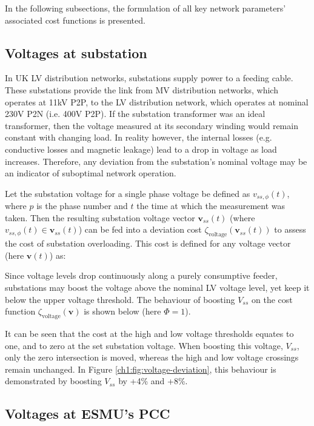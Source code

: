In the following subsections, the formulation of all key network parameters' associated cost functions is presented.

\subsection{Voltages at substation}
\label{ch1:subsec:voltages-at-substation}

In UK LV distribution networks, substations supply power to a feeding cable.
These substations provide the link from MV distribution networks, which operates at 11kV P2P, to the LV distribution network, which operates at nominal 230V P2N (i.e. 400V P2P).
If the substation transformer was an ideal transformer, then the voltage measured at its secondary winding would remain constant with changing load.
In reality however, the internal losses (e.g. conductive losses and magnetic leakage) lead to a drop in voltage as load increases.
Therefore, any deviation from the substation's nominal voltage may be an indicator of suboptimal network operation.

Let the substation voltage for a single phase voltage be defined as $v_{ss,\phi}(t)$, where $p$ is the phase number and $t$ the time at which the measurement was taken.
Then the resulting substation voltage vector $\textbf{v}_{ss}(t)$ (where $v_{ss,\phi}(t) \in \textbf{v}_{ss}(t)$) can be fed into a deviation cost $\zeta_\text{voltage}(\textbf{v}_{ss}(t))$ to assess the cost of substation overloading.
This cost is defined for any voltage vector (here $\textbf{v}(t)$) as:



Since voltage levels drop continuously along a purely consumptive feeder, substations may boost the voltage above the nominal LV voltage level, yet keep it below the upper voltage threshold.
The behaviour of boosting $V_{ss}$ on the cost function $\zeta_\text{voltage}(\textbf{v})$ is shown below (here $\Phi = 1$).



It can be seen that the cost at the high and low voltage thresholds equates to one, and to zero at the set substation voltage.
When boosting this voltage, $V_{ss}$, only the zero intersection is moved, whereas the high and low voltage crossings remain unchanged.
In Figure \ref{ch1:fig:voltage-deviation}, this behaviour is demonstrated by boosting $V_{ss}$ by +4\% and +8\%.

\subsection{Voltages at ESMU's PCC}
\label{ch1:subsec:voltages-at-esmu}

